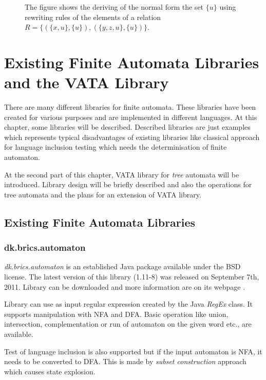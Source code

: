 \begin{figure}[bt]
  \begin{center}
    
    \caption{The figure shows the deriving of the normal form the set $\{u\}$ using rewriting
      rules of the elements of a relation $R=\{(\{x,u\},\{u\}),(\{y,z,u\},\{u\})\}$.}
    \label{figHKCRewO}
  \end{center}
\end{figure}

\chapter{Existing Finite Automata Libraries and the VATA Library} 
\label{libraries}
There are many different libraries for finite automata. These libraries have been created for various purposes and 
are implemented in different languages. 
At this chapter, some libraries will be described. Described libraries are just examples which represents typical disadvantages of existing libraries like
classical approach for language inclusion testing which needs the determinisation of finite automaton. 

At the second part of this chapter, VATA library for \emph{tree} automata will be introduced. 
Library design will be briefly described and also the operations for tree
automata and the plans for an extension of VATA library.

\section{Existing Finite Automata Libraries}
\label{existinglibraries}
\subsection{dk.brics.automaton}
\label{brics}
\emph{dk.brics.automaton} is an established Java package available under the BSD license. The latest version of this library (1.11-8) 
was released on September 7th, 2011.
Library can be downloaded and more information are on its webpage \cite{brics}. 

Library can use as input regular expression created by the Java \emph{RegEx} class.
It supports manipulation with NFA and DFA. Basic operation like union,
intersection, complementation or run of automaton on the given word etc., are available.

Test of language inclusion is also supported but if the input automaton is NFA, it needs to be converted to DFA. 
This is made by \emph{subset construction} approach which causes state explosion.

